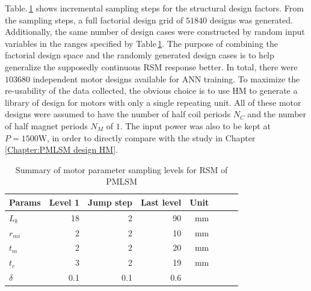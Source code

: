             
            Table.\,\ref{table:RSM design level for PMLSM} shows incremental sampling steps for the structural design factors. From the sampling steps, a full factorial design grid of $51840$ designs was generated. Additionally, the same number of design cases were constructed by random input variables in the ranges specified by Table\,\ref{table:RSM design level for PMLSM}. The purpose of combining the factorial design space and the randomly generated design cases is to help generalize the supposedly continuous \acs{RSM} response better. In total, there were $103680$ independent motor designs available for \acs{ANN} training. To maximize the re-usability of the data collected, the obvious choice is to use \acs{HM} to generate a library of design for motors with only a single repeating unit. All of these motor designs were assumed to have the number of half coil periods $N_C$ and the number of half magnet periods $N_M$ of $1$. The input power was also to be kept at $P=1500\mathrm{W}$, in order to directly compare with the study in Chapter\,\ref{Chapter:PMLSM design HM}.
            
            
            \begin{table}[!h]
                \renewcommand{\arraystretch}{1.2}
                \caption{Summary of motor parameter sampling levels for \acs{RSM} of \acs{PMLSM}}
                \label{table:RSM design level for PMLSM}
                \centering
                \begin{tabular}{@{}l r r r r r r r@{}}
                \hline
                \bfseries Params & \bfseries Level 1 & \bfseries Jump step & \bfseries Last level & \bfseries Unit \\
                \hline
                    $L_k$       &   18     &   2     &   90     &   $\mathrm{mm}$\\
                    $r_{mi}$    &    2     &   2     &   10     &   $\mathrm{mm}$\\
                    $t_m$       &    2     &   2     &   20     &   $\mathrm{mm}$\\
                    $t_c$       &    3     &   2     &   19     &   $\mathrm{mm}$\\
                    $\delta$    &  0.1     & 0.1     &  0.6     &   \\
                \hline
                \end{tabular}
            \end{table}
        
        
